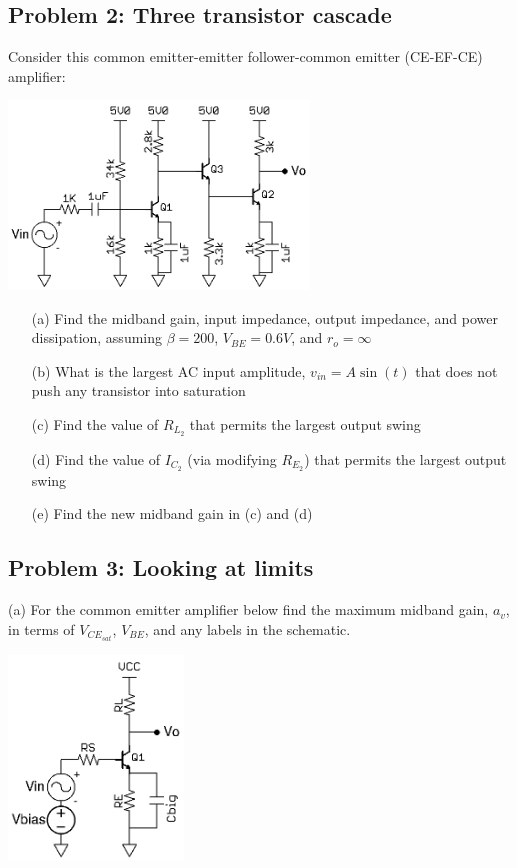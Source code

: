 \documentclass[11pt,twoside]{article}
\begin{document}
\subsection*{Problem 2: Three transistor cascade}
	Consider this common emitter-emitter follower-common emitter (CE-EF-CE) amplifier:
\begin{center}
\includegraphics[width=0.6\textwidth]{ce-ef-ce.png}
\end{center}
\begin{enumerate}
	\item[(a)] Find the midband gain, input impedance, output impedance, and power dissipation, assuming $\beta=200$, $V_{BE}=0.6V$, and $r_o=\infty$
	\item[(b)] What is the largest AC input amplitude, $v_{in}=A\sin(t)$ that does not push any transistor into saturation
	\item[(c)] Find the value of $R_{L_2}$ that permits the largest output swing
	\item[(d)] Find the value of $I_{C_2}$ (via modifying $R_{E_2}$) that permits the largest output swing
	\item[(e)] Find the new midband gain in (c) and (d)
\end{enumerate}

\subsection*{Problem 3: Looking at limits}
	\item[(a)] For the common emitter amplifier below find the maximum midband gain, $a_v$, in terms of $V_{CE_{sat}}$, $V_{BE}$, and any labels in the schematic. 

\begin{center}
\includegraphics[width=0.35\textwidth]{ce-max.png}
\end{center}
\end{document}
